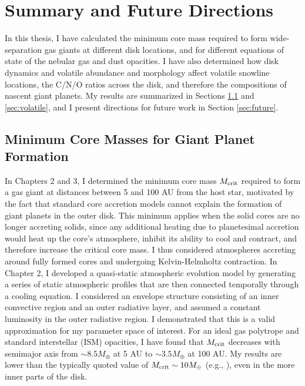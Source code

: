 \chapter{Summary and Future Directions}
\label{conclusion}

In this thesis, I have calculated the minimum core mass required to form wide-separation gas giants at different disk locations, and for different equations of state of the nebular gas and dust opacities. I have also determined how disk dynamics and volatile abundance and morphology affect volatile snowline locations, the C/N/O ratios across the disk, and therefore the compositions of nascent giant planets. My results are summarized in Sections \ref{sec:core} and \ref{sec:volatile}, and I present directions for future work in Section \ref{sec:future}. 

\section{Minimum Core Masses for Giant Planet Formation}
\label{sec:core}

In Chapters 2 and 3, I determined the minimum core mass $M_{\rm crit}$ required to form a gas giant at distances between 5 and 100 AU from the host star, motivated by the fact that standard core accretion models cannot explain the formation of giant planets in the outer disk. This minimum applies when the solid cores are no longer accreting solids, since any additional heating due to planetesimal accretion would heat up the core's atmosphere, inhibit its ability to cool and contract, and therefore increase the critical core mass. I thus considered atmospheres accreting around fully formed cores and undergoing Kelvin-Helmholtz contraction. In Chapter 2, I developed a quasi-static atmospheric evolution model by generating a series of static atmospheric profiles that are then connected temporally through a cooling equation. I considered an envelope structure consisting of an inner convective region and an outer radiative layer, and assumed a constant luminosity in the outer radiative region. I demonstrated that this is a valid approximation for my parameter space of interest. For an ideal gas polytrope and standard interstellar (ISM) opacities, I have found that $M_{\rm crit}$ decreases with semimajor axis from $\sim 8.5 M_{\oplus}$ at 5 AU to $\sim 3.5 M_{\oplus}$ at 100 AU. My results are lower than the typically quoted value of $M_{\rm crit} \sim 10 M_{\oplus}$ (e.g., \citealt{rafikov06}), even in the more inner parts of the disk. 

